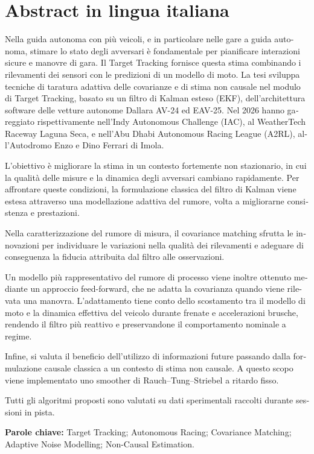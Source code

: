 \documentclass{Configuration_Files/PoliMi3i_thesis}
\begin{document}
\chapter*{Abstract in lingua italiana}
\makeatletter\@openrighttrue\makeatother\let\cleardoublepage\origcleardoublepage
\begin{otherlanguage}{italian}
\setlength{\parskip}{4pt}%

Nella guida autonoma con più veicoli, e in particolare nelle gare a guida autonoma, stimare lo stato degli avversari è fondamentale per pianificare interazioni sicure e manovre di gara. Il Target Tracking fornisce questa stima combinando i rilevamenti dei sensori con le predizioni di un modello di moto. La tesi sviluppa tecniche di taratura adattiva delle covarianze e di stima non causale nel modulo di Target Tracking, basato su un filtro di Kalman esteso (EKF), dell'architettura software delle vetture autonome Dallara AV-24 ed EAV-25. Nel 2026 hanno gareggiato rispettivamente nell'Indy Autonomous Challenge (IAC), al WeatherTech Raceway Laguna Seca, e nell'Abu Dhabi Autonomous Racing League (A2RL), all'Autodromo Enzo e Dino Ferrari di Imola.

L'obiettivo è migliorare la stima in un contesto fortemente non stazionario, in cui la qualità delle misure e la dinamica degli avversari cambiano rapidamente. Per affrontare queste condizioni, la formulazione classica del filtro di Kalman viene estesa attraverso una modellazione adattiva del rumore, volta a migliorarne consistenza e prestazioni.

Nella caratterizzazione del rumore di misura, il covariance matching sfrutta le innovazioni per individuare le variazioni nella qualità dei rilevamenti e adeguare di conseguenza la fiducia attribuita dal filtro alle osservazioni.

Un modello più rappresentativo del rumore di processo viene inoltre ottenuto mediante un approccio feed-forward, che ne adatta la covarianza quando viene rilevata una manovra. L'adattamento tiene conto dello scostamento tra il modello di moto e la dinamica effettiva del veicolo durante frenate e accelerazioni brusche, rendendo il filtro più reattivo e preservandone il comportamento nominale a regime.

Infine, si valuta il beneficio dell'utilizzo di informazioni future passando dalla formulazione causale classica a un contesto di stima non causale. A questo scopo viene implementato uno smoother di Rauch--Tung--Striebel a ritardo fisso.

Tutti gli algoritmi proposti sono valutati su dati sperimentali raccolti durante sessioni in pista.

\medskip
\noindent\textbf{Parole chiave:} \foreignlanguage{english}{Target Tracking; Autonomous Racing; Covariance Matching; Adaptive Noise Modelling; Non-Causal Estimation}.
\end{otherlanguage}
\end{document}
